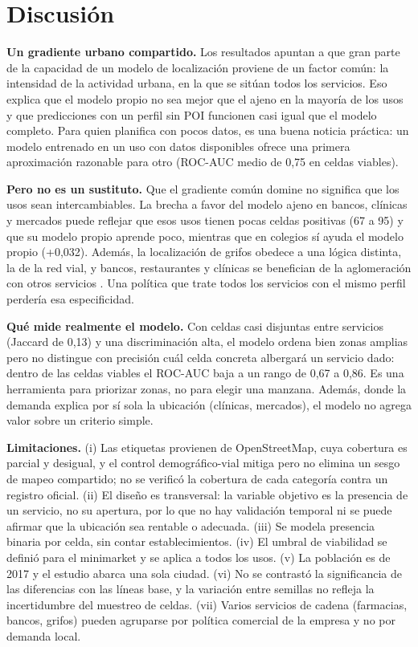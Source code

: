 \documentclass[10pt,letterpaper,twocolumn]{article}
\begin{document}
\section{Discusión}

\textbf{Un gradiente urbano compartido.} Los resultados apuntan a que gran parte de la capacidad de un modelo de localización proviene de un factor común: la intensidad de la actividad urbana, en la que se sitúan todos los servicios. Eso explica que el modelo propio no sea mejor que el ajeno en la mayoría de los usos y que predicciones con un perfil sin POI funcionen casi igual que el modelo completo. Para quien planifica con pocos datos, es una buena noticia práctica: un modelo entrenado en un uso con datos disponibles ofrece una primera aproximación razonable para otro (ROC-AUC medio de 0,75 en celdas viables).

\textbf{Pero no es un sustituto.} Que el gradiente común domine no significa que los usos sean intercambiables. La brecha a favor del modelo ajeno en bancos, clínicas y mercados puede reflejar que esos usos tienen pocas celdas positivas (67 a 95) y que su modelo propio aprende poco, mientras que en colegios sí ayuda el modelo propio (+0,032). Además, la localización de grifos obedece a una lógica distinta, la de la red vial, y bancos, restaurantes y clínicas se benefician de la aglomeración con otros servicios \citep[véase también][]{zhang2025}. Una política que trate todos los servicios con el mismo perfil perdería esa especificidad.

\textbf{Qué mide realmente el modelo.} Con celdas casi disjuntas entre servicios (Jaccard de 0,13) y una discriminación alta, el modelo ordena bien zonas amplias pero no distingue con precisión cuál celda concreta albergará un servicio dado: dentro de las celdas viables el ROC-AUC baja a un rango de 0,67 a 0,86. Es una herramienta para priorizar zonas, no para elegir una manzana. Además, donde la demanda explica por sí sola la ubicación (clínicas, mercados), el modelo no agrega valor sobre un criterio simple.

\textbf{Limitaciones.} (i) Las etiquetas provienen de OpenStreetMap, cuya cobertura es parcial y desigual, y el control demográfico-vial mitiga pero no elimina un sesgo de mapeo compartido; no se verificó la cobertura de cada categoría contra un registro oficial. (ii) El diseño es transversal: la variable objetivo es la presencia de un servicio, no su apertura, por lo que no hay validación temporal ni se puede afirmar que la ubicación sea rentable o adecuada. (iii) Se modela presencia binaria por celda, sin contar establecimientos. (iv) El umbral de viabilidad se definió para el minimarket y se aplica a todos los usos. (v) La población es de 2017 y el estudio abarca una sola ciudad. (vi) No se contrastó la significancia de las diferencias con las líneas base, y la variación entre semillas no refleja la incertidumbre del muestreo de celdas. (vii) Varios servicios de cadena (farmacias, bancos, grifos) pueden agruparse por política comercial de la empresa y no por demanda local.
\end{document}
